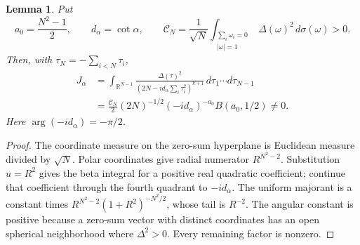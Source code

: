 \documentclass[11pt]{article}
\numberwithin{equation}{section}
\newtheorem{lemma}[theorem]{Lemma}
\theoremstyle{remark}\newtheorem{remark}[theorem]{Remark}
\begin{document}
\begin{lemma}\label{lem:single-period}
Put
\[
 a_0=\frac{N^2-1}{2},\qquad d_\alpha=\cot\alpha,\qquad
 \mathcal C_N=\frac1{\sqrt N}
   \int_{\substack{\sum_i\omega_i=0\\|\omega|=1}}
                   \Delta(\omega)^2\,d\sigma(\omega)>0.
\]
Then, with $\tau_N=-\sum_{i<N}\tau_i$,
\begin{equation}\label{eq:single-period}
 \begin{split}
 J_\alpha
 &=\int_{\mathbb R^{N-1}}
  \frac{\Delta(\tau)^2}
       {(2N-i d_\alpha\sum_i\tau_i^2)^{k+1}}
                      \,d\tau_1\cdots d\tau_{N-1}\\
 &=\frac{\mathcal C_N}{2}(2N)^{-1/2}
       (-i d_\alpha)^{-a_0}B(a_0,1/2)\ne0.
 \end{split}
\end{equation}
Here $\arg(-i d_\alpha)=-\pi/2$.
\end{lemma}
\begin{proof}
The coordinate measure on the zero-sum hyperplane is Euclidean
measure divided by $\sqrt N$.  Polar coordinates give radial
numerator $R^{N^2-2}$.  Substitution $u=R^2$ gives the beta
integral for a positive real quadratic coefficient; continue that
coefficient through the fourth quadrant to $-i d_\alpha$.
The uniform majorant is a constant times
$R^{N^2-2}(1+R^2)^{-N^2/2}$, whose tail is $R^{-2}$.
The angular constant is positive because a zero-sum vector with
distinct coordinates has an open spherical neighborhood where
$\Delta^2>0$.  Every remaining factor is nonzero.
\end{proof}
\end{document}
